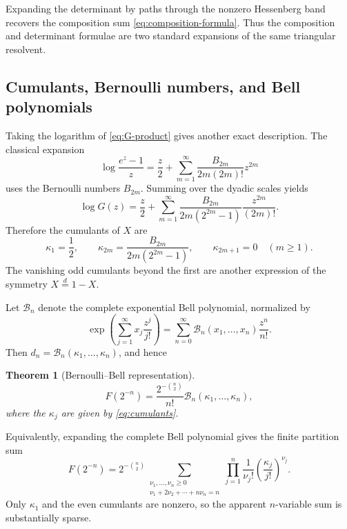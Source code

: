 \documentclass[11pt,oneside]{article}
\newtheorem{theorem}{Theorem}[section]
\theoremstyle{definition}
\theoremstyle{remark}
\newcommand{\Bcal}{\mathcal B}
\begin{document}
Expanding the determinant by paths through the nonzero Hessenberg band
recovers the composition sum \eqref{eq:composition-formula}.  Thus the
composition and determinant formulae are two standard expansions of the same
triangular resolvent.

\subsection{Cumulants, Bernoulli numbers, and Bell polynomials}

Taking the logarithm of \eqref{eq:G-product} gives another exact description.
The classical expansion
\begin{equation}\label{eq:log-E}
 \log\frac{e^z-1}{z}
 =\frac z2+\sum_{m=1}^{\infty}
 \frac{B_{2m}}{2m(2m)!}z^{2m}
\end{equation}
uses the Bernoulli numbers $B_{2m}$.  Summing over the dyadic scales yields
\begin{equation}\label{eq:log-G}
 \log G(z)
 =\frac z2+
 \sum_{m=1}^{\infty}
 \frac{B_{2m}}{2m(2^{2m}-1)}
 \frac{z^{2m}}{(2m)!}.
\end{equation}
Therefore the cumulants of $X$ are
\begin{equation}\label{eq:cumulants}
 \kappa_1=\frac12,
 \qquad
 \kappa_{2m}=\frac{B_{2m}}{2m(2^{2m}-1)},
 \qquad
 \kappa_{2m+1}=0\quad(m\ge1).
\end{equation}
The vanishing odd cumulants beyond the first are another expression of the
symmetry $X\overset d=1-X$.

Let $\Bcal_n$ denote the complete exponential Bell polynomial, normalized by
\begin{equation}\label{eq:Bell-definition}
 \exp\left(\sum_{j=1}^{\infty}x_j\frac{z^j}{j!}\right)
 =\sum_{n=0}^{\infty}\Bcal_n(x_1,\ldots,x_n)\frac{z^n}{n!}.
\end{equation}
Then $d_n=\Bcal_n(\kappa_1,\ldots,\kappa_n)$, and hence
\begin{theorem}[Bernoulli--Bell representation]\label{thm:Bell}
\begin{equation}\label{eq:Bell-dyadic}
 \boxed{
 F(2^{-n})
 =\frac{2^{-\binom n2}}{n!}
 \Bcal_n(\kappa_1,\ldots,\kappa_n),}
\end{equation}
where the $\kappa_j$ are given by \eqref{eq:cumulants}.
\end{theorem}
Equivalently, expanding the complete Bell polynomial gives the finite partition
sum
\begin{equation}\label{eq:cumulant-partition}
 F(2^{-n})
 =2^{-\binom n2}
 \sum_{\substack{\nu_1,\ldots,\nu_n\ge0\\
                    \nu_1+2\nu_2+\cdots+n\nu_n=n}}
 \prod_{j=1}^{n}
 \frac1{\nu_j!}
 \left(\frac{\kappa_j}{j!}\right)^{\nu_j}.
\end{equation}
Only $\kappa_1$ and the even cumulants are nonzero, so the apparent
$n$-variable sum is substantially sparse.
\end{document}
